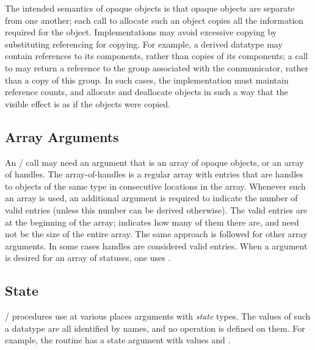 \begin{implementors}
The intended semantics of opaque objects is that opaque objects are separate
from one another; each call to allocate such an object copies all the information
required for the object.   Implementations may avoid excessive copying by
substituting referencing for copying.  For example, a derived datatype
may contain
references to its components, rather than copies of its components; a call to
 may return a reference to the group associated with
the communicator, rather than a copy of this group.  In such cases, the
implementation must maintain reference counts, and allocate and deallocate
objects in such a way that the visible effect is as if the objects were copied.
\end{implementors}

\subsection{Array Arguments}
\label{subsec:array-arguments}

An \MPI/ call may need an argument that is an array of opaque objects,
or an array of handles.  The array-of-handles is a regular array with
entries that are handles to objects of the same type in consecutive
locations in the array.  Whenever such an array is used, an additional
 argument is required to indicate the number of valid
entries (unless this number can be derived otherwise).  The valid
entries are at the beginning of the array;
 indicates how many of them there are, and need not be
the size of the entire array.  The same approach is followed for other
array arguments.  In some cases  handles are considered
valid entries.
When a  argument is desired for an array
of statuses, one uses .

\subsection{State}

\MPI/ procedures use at various places arguments with \emph{state} types.  The
values of such a datatype are all identified by names, and no operation is
defined on them.
For example, the  routine has a
state argument  with values
 and .

